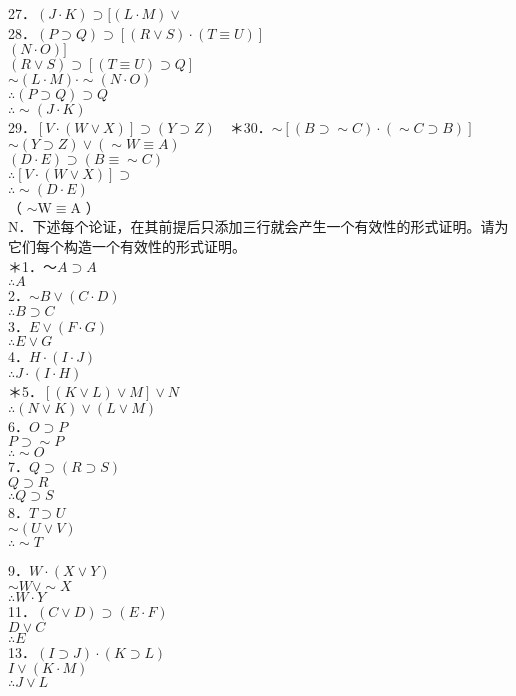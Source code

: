 27．$(J \cdot K) \supset[(L \cdot M) \vee$\\
28．$(P \supset Q) \supset[(R \vee S) \cdot(T \equiv U)]$\\
$(N \cdot O)]$\\
$(R \vee S) \supset[(T \equiv U) \supset Q]$\\
$\sim(L \cdot M) \cdot \sim(N \cdot O)$\\
$\therefore(P \supset Q) \supset Q$\\
$\therefore \sim(J \cdot K)$\\
29．$[V \cdot(W \vee X)] \supset(Y \supset Z) \quad$＊30．$\sim[(B \supset \sim C) \cdot(\sim C \supset B)]$\\
$\sim(Y \supset Z) \vee(\sim W \equiv A)$\\
$(D \cdot E) \supset(B \equiv \sim C)$\\
$\therefore[V \cdot(W \vee X)] \supset$\\
$\therefore \sim(D \cdot E)$\\
（ $\sim \mathrm{W} \equiv \mathrm{A}$ ）\\
N．下述每个论证，在其前提后只添加三行就会产生一个有效性的形式证明。请为它们每个构造一个有效性的形式证明。\\
＊1．～$A \supset A$\\
$\therefore A$\\
2．$\sim B \vee(C \cdot D)$\\
$\therefore B \supset C$\\
3．$E \vee(F \cdot G)$\\
$\therefore E \vee G$\\
4．$H \cdot(I \cdot J)$\\
$\therefore J \cdot(I \cdot H)$\\
＊5．$[(K \vee L) \vee M] \vee N$\\
$\therefore(N \vee K) \vee(L \vee M)$\\
6．$O \supset P$\\
$P \supset \sim P$\\
$\therefore \sim O$\\
7．$Q \supset(R \supset S)$\\
$Q \supset R$\\
$\therefore Q \supset S$\\
8．$T \supset U$\\
$\sim(U \vee V)$\\
$\therefore \sim T$

9．$W \cdot(X \vee Y)$\\
$\sim W \vee \sim X$\\
$\therefore W \cdot Y$\\
11．$(C \vee D) \supset(E \cdot F)$\\
$D \vee C$\\
$\therefore E$\\
13．$(I \supset J) \cdot(K \supset L)$\\
$I \vee(K \cdot M)$\\
$\therefore J \vee L$

